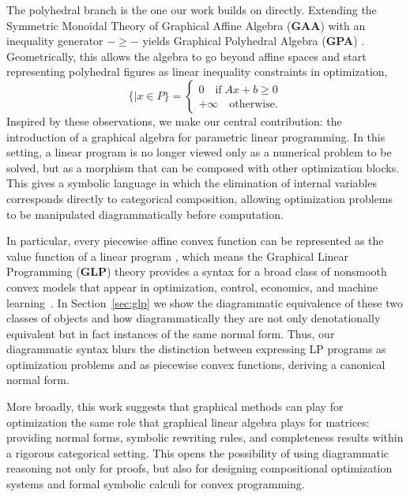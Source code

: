 The polyhedral branch is the one our work builds on directly. Extending the Symmetric Monoidal Theory of
Graphical Affine Algebra (\textbf{GAA}) \cite{bonchi2019affine} with an inequality generator $-\ge -$ yields
Graphical Polyhedral Algebra (\textbf{GPA}) \cite{bonchi2021polyhedral}. Geometrically,
this allows the algebra to go beyond affine spaces and start representing polyhedral figures as linear inequality constraints in optimization,
\[
	\{| x \in P\} =
	\begin{cases}
		0 \quad \text{if} \;Ax +b\ge 0 \\
		+\infty \quad \text{otherwise.}
	\end{cases}
\]
Inspired by these observations, we make our central contribution: the introduction of a graphical
algebra for parametric linear programming. In this
setting, a linear program is no longer viewed only as
a numerical problem to be solved, but as a morphism that
can be composed with other optimization blocks.
This gives a symbolic language in which the elimination of internal variables
corresponds directly to categorical composition, allowing optimization problems
to be manipulated diagrammatically before computation.

In particular, every piecewise affine convex function can be represented as the value function of a linear program \cite{rockafellar1970convex}, which means the Graphical Linear Programming (\textbf{GLP}) theory provides a syntax for a broad class of nonsmooth convex models that appear in optimization, control, economics, and machine learning~\cite{boyd2004convex}. In Section~\ref{sec:glp} we show the diagrammatic equivalence of these two classes of objects and how diagrammatically they are not only denotationally equivalent but in fact instances of the same normal form. Thus, our diagrammatic syntax blurs the distinction between expressing LP programs as optimization problems and as piecewise convex functions, deriving a canonical normal form.

More broadly, this work suggests that graphical methods can play for optimization the same role that graphical linear algebra plays for matrices: providing normal forms, symbolic rewriting rules, and completeness results within a rigorous categorical setting. This opens the possibility of using diagrammatic reasoning not only for proofs, but also for designing compositional optimization systems and formal symbolic calculi for convex programming.


